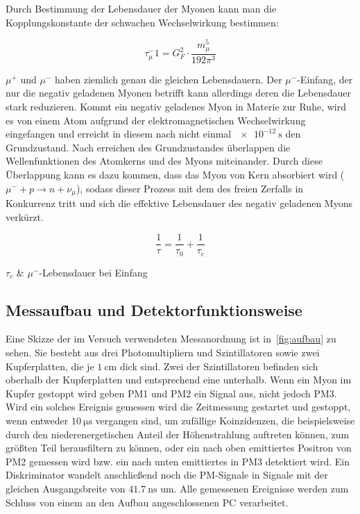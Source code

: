 \documentclass[slug=LM, room=Andreas-Schubert-Bau\,\ K\ 1A, supervisor=Anne-Sophie\ Berthold, coursedate=13.\ 12.\ 2019]{../../Lab_Report_LaTeX/lab_report}
\begin{document}
Durch Bestimmung der Lebensdauer der Myonen kann man die Kopplungskonstante der schwachen
Wechselwirkung bestimmen:

\begin{equation} \label{eq:kopplkonst}
	\tau_\mu^-1 = G_F^2 \cdot \frac{m_\mu^5}{192 \pi^3}
\end{equation}

\(\mu^+\) und \(\mu^-\) haben ziemlich genau die gleichen Lebensdauern. 
Der \(\mu^-\)-Einfang, der nur die negativ geladenen Myonen betrifft kann allerdings deren
die Lebensdauer stark reduzieren.
Kommt ein negativ geladenes Myon in Materie zur Ruhe, wird es von einem Atom aufgrund der
elektromagnetischen Wechselwirkung eingefangen und erreicht in diesem nach nicht einmal
\(\SI{e-12}{\second}\) den Grundzustand. Nach erreichen des Grundzustandes überlappen die
Wellenfunktionen des Atomkerns und des Myons miteinander. Durch diese Überlappung kann es dazu
kommen, dass das Myon von Kern absorbiert wird (\(\mu^- + p \rightarrow n + \nu_\mu\)), sodass 
dieser Prozess mit dem des freien Zerfalls in Konkurrenz tritt und sich die effektive Lebensdauer 
des negativ geladenen Myons verkürzt.

\begin{equation}\label{eq:efflebenszeit}
	\frac{1}{\tau} = \frac{1}{\tau_0} + \frac{1}{\tau_c}
\end{equation}

\begin{conditions}
	\(\tau_c\) & \(\mu^-\)-Lebensdauer bei Einfang
\end{conditions}

\subsection{Messaufbau und Detektorfunktionsweise}
\label{sec:aufbau}

Eine Skizze der im Versuch verwendeten Messanordnung ist in~\ref*{fig:aufbau} zu sehen.
Sie besteht aus drei Photomultipliern und Szintillatoren sowie zwei Kupferplatten, die je
\(\SI{1}{\centi\metre}\) dick sind. Zwei der Szintillatoren befinden sich oberhalb der Kupferplatten
und entsprechend eine unterhalb.
Wenn ein Myon im Kupfer gestoppt wird geben PM1 und PM2 ein Signal aus, nicht jedoch PM3. Wird ein
solches Ereignis gemessen wird die Zeitmessung gestartet und gestoppt, wenn entweder 
\(\SI{10}{\micro\second}\) vergangen sind, um zufällige Koinzidenzen, die beispielsweise durch
den niederenergetischen Anteil der Höhenstrahlung auftreten können, zum größten Teil
herausfiltern zu können, oder
ein nach oben emittiertes Positron von PM2 gemessen wird bzw. ein nach unten emittiertes in
PM3 detektiert wird. Ein Diskriminator wandelt anschließend noch die PM-Signale in Signale mit der
gleichen Ausgangsbreite von \(\SI{41,7}{\nano\second}\) um. Alle gemessenen Ereignisse werden
zum Schluss von einem an den Aufbau angeschlossenen PC verarbeitet.
\end{document}
